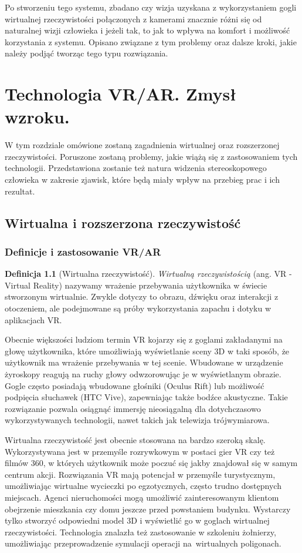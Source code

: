 \documentclass[a4paper,11pt,twoside]{report}
\theoremstyle{definition}
\newtheorem{definition}[theorem]{Definicja}
\begin{document}
Po stworzeniu tego systemu, zbadano czy wizja uzyskana z wykorzystaniem gogli wirtualnej rzeczywistości połączonych z kamerami znacznie różni się od naturalnej wizji człowieka i jeżeli tak, to jak to wpływa na komfort i możliwość korzystania z systemu. Opisano związane z tym problemy oraz dalsze kroki, jakie należy podjąć tworząc tego typu rozwiązania.

\chapter{Technologia VR/AR. Zmysł wzroku.}

W tym rozdziale omówione zostaną zagadnienia wirtualnej oraz rozszerzonej rzeczywistości. Poruszone zostaną problemy, jakie wiążą się z zastosowaniem tych technologii. Przedstawiona zostanie też natura widzenia stereoskopowego człowieka w zakresie zjawisk, które będą miały wpływ na przebieg prac i ich rezultat.

\section{Wirtualna i rozszerzona rzeczywistość}

\subsection{Definicje i zastosowanie VR/AR}

\begin{definition}[Wirtualna rzeczywistość]
\textit{Wirtualną rzeczywistością} (ang. VR - Virtual Reality) nazywamy wrażenie przebywania użytkownika w świecie stworzonym wirtualnie. Zwykle dotyczy to obrazu, dźwięku oraz interakcji z otoczeniem, ale podejmowane są próby wykorzystania zapachu i dotyku w aplikacjach VR.
\end{definition}

Obecnie większości ludziom termin VR kojarzy się z goglami zakładanymi na głowę użytkownika, które umożliwiają wyświetlanie sceny 3D w taki sposób, że użytkownik ma wrażenie przebywania w tej scenie. Wbudowane w urządzenie żyroskopy reagują na ruchy głowy odwzorowując je w wyświetlanym obrazie. Gogle często posiadają wbudowane głośniki (Oculus Rift) lub możliwość podpięcia słuchawek (HTC Vive), zapewniając także bodźce akustyczne. Takie rozwiązanie pozwala osiągnąć immersję nieosiągalną dla dotychczasowo wykorzystywanych technologii, nawet takich jak telewizja trójwymiarowa.

Wirtualna rzeczywistość jest obecnie stosowana na bardzo szeroką skalę. Wykorzystywana jest w przemyśle rozrywkowym w postaci gier VR czy też filmów 360\textdegree, w których użytkownik może poczuć się jakby znajdował się w samym centrum akcji. Rozwiązania VR mają potencjał w przemyśle turystycznym, umożliwiając wirtualne wycieczki po egzotycznych, często trudno dostępnych miejscach. Agenci nieruchomości mogą umożliwić zainteresowanym klientom obejrzenie mieszkania czy domu jeszcze przed powstaniem budynku. Wystarczy tylko stworzyć odpowiedni model 3D i wyświetlić go w goglach wirtualnej rzeczywistości. Technologia znalazła też zastosowanie w szkoleniu żołnierzy, umożliwiając przeprowadzenie symulacji operacji na~wirtualnych poligonach.\cite{VRdefinition}
\end{document}
